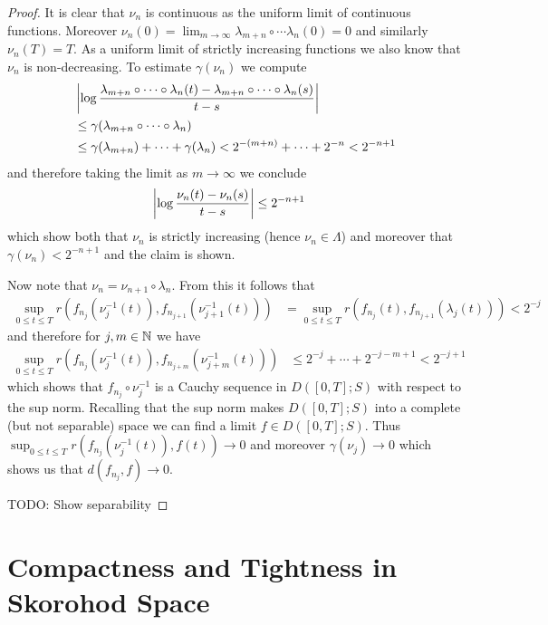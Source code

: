 \begin{proof}
It is clear that $\nu_n$ is continuous as the uniform limit of continuous functions.  Moreover $\nu_n(0) = \lim_{m \to \infty} \lambda_{m+n} \circ \dotsb \lambda_{n}(0) = 0$
and similarly $\nu_n(T) = T$.  As a uniform limit of strictly increasing functions we also know that $\nu_n$ is non-decreasing.  To estimate $\gamma(\nu_n)$ we compute
\begin{align*}
&\left \vert \log \frac{\lambda_{m+n} \circ \dotsb \circ \lambda_n(t) - \lambda_{m+n} \circ \dotsb \circ \lambda_n(s)}{t-s} \right \vert \\
&\leq \gamma(\lambda_{m+n} \circ \dotsb \circ \lambda_n) \\
&\leq \gamma(\lambda_{m+n}) + \dotsm +\gamma(\lambda_n) < 2^{-(m+n)} + \dotsm + 2^{-n} < 2^{-n+1}
\end{align*}
and therefore taking the limit as $m \to \infty$ we conclude 
\begin{align*}
\left \vert \log \frac{\nu_n(t) - \nu_n(s)}{t-s} \right \vert &\leq 2^{-n+1}
\end{align*}
which show both that $\nu_n$ is strictly increasing (hence $\nu_n \in \Lambda$) and moreover that $\gamma(\nu_n) < 2^{-n+1}$ and the claim is shown.

Now note that $\nu_n = \nu_{n+1} \circ \lambda_n$.  From this it follows that
\begin{align*}
\sup_{0 \leq t \leq T} r(f_{n_j}(\nu_j^{-1}(t)), f_{n_{j+1}}(\nu_{j+1}^{-1}(t))) &= \sup_{0 \leq t \leq T} r(f_{n_j}(t),  f_{n_{j+1}}(\lambda_j(t))) < 2^{-j}
\end{align*}
and therefore for $j,m \in \mathbb{N}$ we have
\begin{align*}
\sup_{0 \leq t \leq T} r(f_{n_j}(\nu_j^{-1}(t)), f_{n_{j+m}}(\nu_{j+m}^{-1}(t))) &\leq 2^{-j} + \dotsm + 2^{-j-m+1} < 2^{-j+1}
\end{align*}
which shows that $f_{n_j} \circ \nu_j^{-1}$ is a Cauchy sequence in $D([0,T]; S)$ with respect to the sup norm.  Recalling that the sup norm
makes $D([0,T];S)$ into a complete (but not separable) space we can find a limit $f \in D([0,T]; S)$.  Thus $\sup_{0 \leq t \leq T} r(f_{n_j}(\nu_j^{-1}(t)), f(t)) \to 0$
and moreover $\gamma(\nu_j) \to 0$ which shows us that $d(f_{n_j}, f) \to 0$.

TODO: Show separability
\end{proof}

\section{Compactness and Tightness in Skorohod Space}

